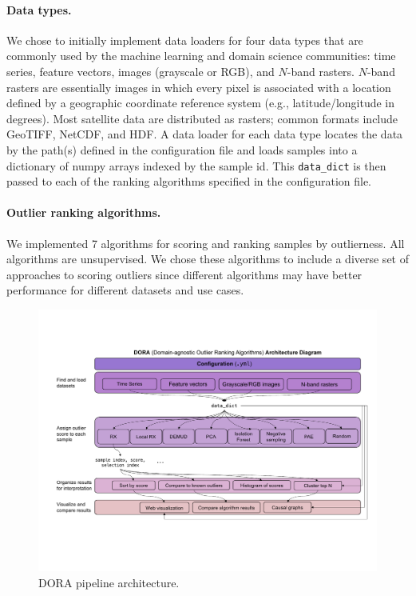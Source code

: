 \documentclass[letterpaper]{article} %
\begin{document}
\paragraph{Data types.} We chose to initially implement data loaders for four
data types that are commonly used by the machine learning and domain science
communities: time series, feature vectors, images (grayscale or RGB), and 
$N$-band rasters. $N$-band rasters are essentially images in which every pixel
is associated with a location defined by a geographic coordinate reference 
system (e.g., latitude/longitude in degrees). Most satellite data are 
distributed as rasters; common formats include GeoTIFF, NetCDF, and 
HDF. A data loader for each data type locates the data by the path(s)
defined in the configuration file and loads samples into a dictionary of numpy
 arrays indexed by the sample id. This \texttt{data\_dict} is then passed to each of the ranking algorithms specified in 
 the configuration file.

\paragraph{Outlier ranking algorithms.} We implemented 7 algorithms for 
scoring and 
ranking samples by outlierness. All algorithms are unsupervised.
We chose these algorithms to include a diverse
set of approaches to scoring outliers since different algorithms may have 
better performance for different datasets and use cases. 

\begin{figure}
    \centering
    \includegraphics[width=\linewidth]{figures/dora-system-diagram-v5.pdf}
    \caption{DORA pipeline architecture.}
    \label{fig:dora}
\end{figure}
\end{document}
